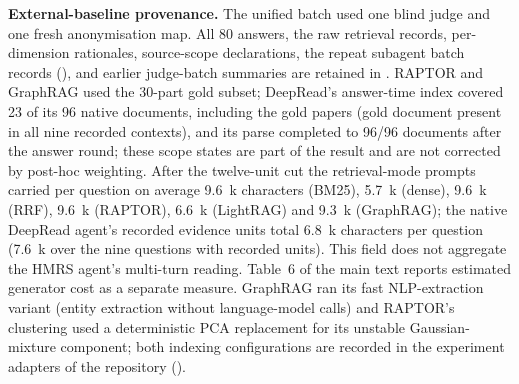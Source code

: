 \noindent\textbf{External-baseline provenance.} The unified batch used one
blind judge and one fresh anonymisation map. All 80 answers, the raw retrieval
records, per-dimension rationales, source-scope declarations, the repeat
subagent batch records (), and earlier
judge-batch summaries are retained in
. RAPTOR and GraphRAG used the
30-part gold subset; DeepRead's answer-time index covered 23 of its 96
native documents, including the gold papers (gold document present in all
nine recorded contexts), and its parse completed to 96/96 documents after
the answer round; these scope
states are part of the result and are not corrected by post-hoc weighting.
After the twelve-unit cut the retrieval-mode prompts carried per question
on average 9.6~k characters (BM25), 5.7~k (dense), 9.6~k (RRF), 9.6~k
(RAPTOR), 6.6~k (LightRAG) and 9.3~k (GraphRAG); the native DeepRead
agent's recorded evidence units total 6.8~k characters per question
(7.6~k over the nine questions with recorded units). This field does not
aggregate the HMRS agent's multi-turn reading. Table~6 of the main text
reports estimated generator cost as a separate measure.
GraphRAG ran its fast NLP-extraction variant (entity extraction without
language-model calls) and RAPTOR's clustering used a deterministic PCA
replacement for its unstable Gaussian-mixture component; both indexing
configurations are recorded in the experiment adapters of the repository
().

